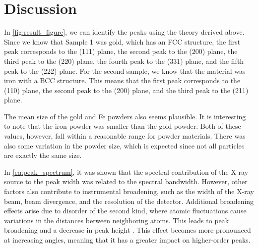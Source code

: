 \section{Discussion}
In \autoref{fig:result_figure}, we can identify the peaks using the theory derived above. Since we know that Sample 1 was gold, which has an FCC structure, the first peak corresponds to the (111) plane, the second peak to the (200) plane, the third peak to the (220) plane, the fourth peak to the (331) plane, and the fifth peak to the (222) plane. For the second sample, we know that the material was iron with a BCC structure. This means that the first peak corresponds to the (110) plane, the second peak to the (200) plane, and the third peak to the (211) plane.

The mean size of the gold and Fe powders also seems plausible. It is interesting to note that the iron powder was smaller than the gold powder. Both of these values, however, fall within a reasonable range for powder materials. There was also some variation in the powder size, which is expected since not all particles are exactly the same size.

In \autoref{eq:peak_spectrum}, it was shown that the spectral contribution of the X-ray source to the peak width was related to the spectral bandwidth. However, other factors also contribute to instrumental broadening, such as the width of the X-ray beam, beam divergence, and the resolution of the detector. Additional broadening effects arise due to disorder of the second kind, where atomic fluctuations cause variations in the distances between neighboring atoms. This leads to peak broadening and a decrease in peak height \cite{guinier1963xray}. This effect becomes more pronounced at increasing angles, meaning that it has a greater impact on higher-order peaks.